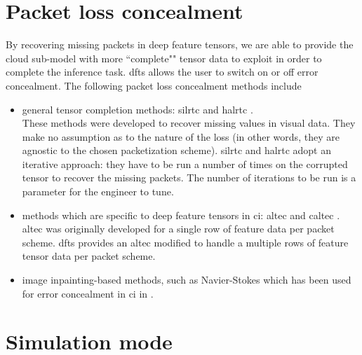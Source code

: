 \section{Packet loss concealment} \label{sec:simdescr:ec}
By recovering missing packets in deep feature tensors, we are able to provide the cloud sub-model with more ``complete"" tensor data to exploit in order to complete the inference task. \gls{dfts} allows the user to switch on or off error concealment. The following packet loss concealment methods include
\begin{itemize}
	\item general tensor completion methods: \gls{silrtc} \cite{liu2012tensor} and \gls{halrtc} \cite{liu2012tensor}.\\
	These methods were developed to recover missing values in visual data. They make no assumption as to the nature of the loss (in other words, they are agnostic to the chosen packetization scheme). \gls{silrtc} and \gls{halrtc} adopt an iterative approach: they have to be run a number of times on the corrupted tensor to recover the missing packets. The number of iterations to be run is a parameter for the engineer to tune.
	\item methods which are specific to deep feature tensors in \gls{ci}: \gls{altec} \cite{Bragile2020} and \gls{caltec} \cite{CALTeC_ICIP_2021}. \\ \gls{altec} was originally developed for a single row of feature data per packet scheme. \gls{dfts} provides an \gls{altec} modified to handle a multiple rows of feature tensor data per packet scheme.
	\item image inpainting-based methods, such as Navier-Stokes \cite{navierstokes} which has been used for error concealment in \gls{ci} in \cite{Bajic2021objdet}.
\end{itemize}

\section{Simulation mode} \label{sec:simdescr:simmode}